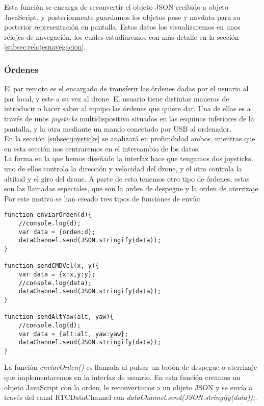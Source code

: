 Esta función se encarga de reconvertir el objeto JSON recibido a objeto JavaScript, y posteriormente guardamos los objetos pose y navdata para su posterior representación en pantalla. Estos datos los visualizaremos en unos relojes de navegación, los cuáles estudiaremos con más detalle en la sección \ref{subsec:relojesnavegacion}.\\


\subsubsection{Órdenes}\label{subsec:ordenes}

El par remoto es el encargado de transferir las órdenes dadas por el usuario al par local, y este a su vez al drone. El usuario tiene distintas maneras de introducir o hacer saber al equipo las órdenes que quiere dar. Una de ellas es a través de unos \emph{joysticks} multidispositivo situados en las esquinas inferiores de la pantalla, y la otra mediante un mando conectado por USB al ordenador.\\

En la sección \ref{subsec:joysticks} se analizará en profundidad ambos, mientras que en esta sección nos centraremos en el intercambio de los datos.\\

La forma en la que hemos diseñado la interfaz hace que tengamos dos joysticks, uno de ellos controla la dirección y velocidad del drone, y el otro controla la altitud y el giro del drone. A parte de esto tenemos otro tipo de órdenes, estas son las llamadas especiales, que son la orden de despegue y la orden de aterrizaje. Por este motivo se han creado tres tipos de funciones de envío:\\

\begin{lstlisting}[caption=Funciones de envío de órdenes en el par remoto.]
function enviarOrden(d){
    //console.log(d);
    var data = {orden:d};
    dataChannel.send(JSON.stringify(data));
}

function sendCMDVel(x, y){
    var data = {x:x,y:y};
    //console.log(data);
    dataChannel.send(JSON.stringify(data));
}

function sendAltYaw(alt, yaw){
    //console.log(d);
    var data = {alt:alt, yaw:yaw};
    dataChannel.send(JSON.stringify(data));
}
\end{lstlisting}

La función \emph{enviarOrden()} es llamada al pulsar un botón de despegue o aterrizaje que implementaremos en la interfaz de usuario. En esta función creamos un objeto JavaScript con la orden, le reconvertimos a un objeto JSON y se envía a través del canal RTCDataChannel con \emph{dataChannel.send(JSON.stringify(data));}.\\


